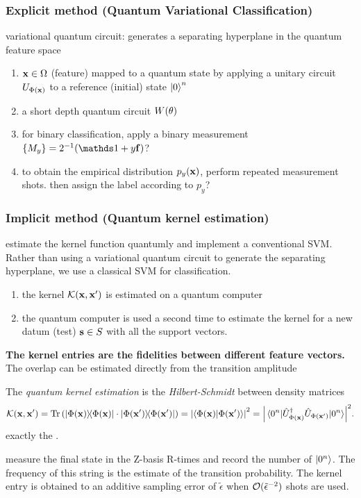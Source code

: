 \subsubsection*{Explicit method (Quantum Variational Classification)}
variational quantum circuit: generates a separating hyperplane in the quantum feature space
\begin{enumerate}
	\item $\vb{x}\in\Omega$ (feature) mapped to a quantum state by applying a unitary circuit $U_{\Phi(\vb{x})}$ to a reference (initial) state $\ket{0}^n$
	\item a short depth quantum circuit $W(\vb{\theta})$
	\item for binary classification, apply a binary measurement $\qty{M_y}=2^{-1}(\identity + y \vb{f})$?
	\item to obtain the empirical distribution $p_y(\vb{x})$, perform repeated measurement shots.
	then assign the label according to $p_y$?
\end{enumerate}

\subsubsection*{Implicit method (Quantum kernel estimation)}
estimate the kernel function quantumly and implement a conventional SVM.
Rather than using a variational quantum circuit to generate the separating hyperplane, we use a classical SVM for classification.
\begin{enumerate}
	\item the kernel $\mathcal{K}(\vb{x},\vb{x}')$ is estimated on a quantum computer
	\item the quantum computer is used a second time to estimate the kernel for a new datum (test) $\vb{s}\in S$ with all the support vectors.
\end{enumerate}

\textbf{The kernel entries are the fidelities between different feature vectors.}
The overlap can be estimated directly from the transition amplitude 
\begin{definition}\label{def:quantum_kernel}
	The \emph{quantum kernel estimation} is the \emph{Hilbert-Schmidt}  between density matrices
	\begin{equation}
		\kernel(\vbx,\vbx') 
		= \Tr\qty(\dyad{\Phi(\vbx)}\cdot \dyad{\Phi(\vbx')})
		= \abs{\braket{\Phi(\vbx)}{\Phi(\vbx')}}^2 = 
		\abs{\matrixel{0^n}{\U^\dagger_{\Phi(\vbx)} \U_{\Phi(\vbx')}}{0^n}}^2.
	\end{equation}
	exactly the .
\end{definition}
measure the final state in the Z-basis R-times and record the number of $\ket{0^n}$.
The frequency of this string is the estimate of the transition probability.
The kernel entry is obtained to an additive sampling error of $\tilde{\epsilon}$ when $\mathcal{O}(\tilde{\epsilon}^{-2})$ shots are used.

